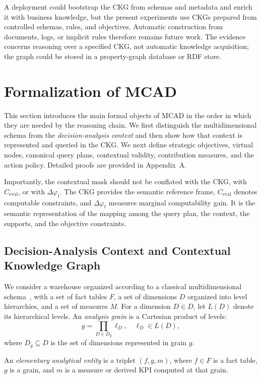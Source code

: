 \documentclass[journal]{IEEEtran}
\begin{document}
A deployment could bootstrap the CKG from schemas and metadata and enrich it with business knowledge, but the present experiments use CKGs prepared from controlled schemas, rules, and objectives. Automatic construction from documents, logs, or implicit rules therefore remains future work. The evidence concerns reasoning over a specified CKG, not automatic knowledge acquisition; the graph could be stored in a property-graph database or RDF store.

\section{Formalization of MCAD}
\label{sec:formal}

This section introduces the main formal objects of MCAD in the order in which they are needed by the reasoning chain. We first distinguish the multidimensional schema from the \emph{decision-analysis context} and then show how that context is represented and queried in the CKG. We next define strategic objectives, virtual nodes, canonical query plans, contextual validity, contribution measures, and the action policy. Detailed proofs are provided in Appendix~A.

Importantly, the contextual mask should not be conflated with the CKG, with $C_{\mathrm{eval}}$, or with $\Delta\varphi_t$. The CKG provides the semantic reference frame, $C_{\mathrm{eval}}$ denotes computable constraints, and $\Delta\varphi_t$ measures marginal computability gain. It is the semantic representation of the mapping among the query plan, the context, the supports, and the objective constraints.

\subsection{Decision-Analysis Context and Contextual Knowledge Graph}

We consider a warehouse organized according to a classical multidimensional schema~\cite{ChaudhuriDayal97,KimballRoss2013}, with a set of fact tables $F$, a set of dimensions $D$ organized into level hierarchies, and a set of measures $M$. For a dimension $D\in D$, let $L(D)$ denote its hierarchical levels. An \emph{analysis grain} is a Cartesian product of levels:
\[
g = \prod_{D\in D_g} \ell_D,\quad \ell_D\in L(D),
\]
where $D_g\subseteq D$ is the set of dimensions represented in grain $g$.

An \emph{elementary analytical entity} is a triplet $(f,g,m)$, where $f\in F$ is a fact table, $g$ is a grain, and $m$ is a measure or derived KPI computed at that grain.
\end{document}
